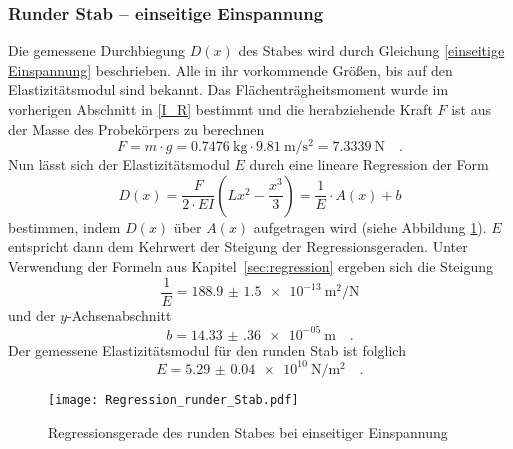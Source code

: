 \subsubsection{Runder Stab -- einseitige Einspannung}
Die gemessene Durchbiegung $D(x)$ des Stabes wird durch Gleichung \eqref{einseitige Einspannung} beschrieben.
Alle in ihr vorkommende Größen, bis auf den Elastizitätsmodul sind bekannt. Das Flächenträgheitsmoment wurde im vorherigen Abschnitt in \eqref{I_R} bestimmt und die herabziehende Kraft $F$ ist aus der Masse des Probekörpers zu berechnen
\begin{equation}
  F = m \cdot g = \SI{0.7476}{\kilo\gram} \cdot \SI{9.81}{\metre\per\second\squared} = \SI{7.3339}{\newton} \quad .
\end{equation}
Nun lässt sich der Elastizitätsmodul $E$ durch eine lineare Regression der Form
\begin{equation}
  D(x) = \frac{F}{2\cdot E I}\left(Lx^2-\frac{x^3}{3}\right) = \frac{1}{E} \cdot A(x) +b
\end{equation}
bestimmen, indem $D(x)$ über $A(x)$ aufgetragen wird (siehe Abbildung \ref{fig:Regression_runder_Stab}). $E$ entspricht dann dem Kehrwert der Steigung der Regressionsgeraden. Unter Verwendung der Formeln aus Kapitel~\ref{sec:regression} ergeben sich die Steigung
\begin{equation}
  \frac{1}{E}= \SI{188.9(15)e-13}{\metre\squared\per\newton}
\end{equation}
und der $y$-Achsenabschnitt
\begin{equation}
  b = \SI{14.33(36)e-05}{\metre} \quad.
\end{equation}
Der gemessene Elastizitätsmodul für den runden Stab ist folglich
\begin{equation}
  E = \SI{5.29(4)e+10}{\newton\per\metre\squared} \quad.
\end{equation}

\begin{figure}
\centering
\texttt{[image: Regression\_runder\_Stab.pdf]}
\caption{Regressionsgerade des runden Stabes bei einseitiger Einspannung}
\label{fig:Regression_runder_Stab}
\end{figure}



